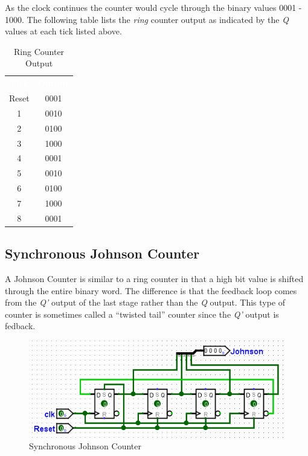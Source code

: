 As the clock continues the counter would cycle through the binary values 0001 - 1000. The following table lists the \textit{ring} counter output as indicated by the \textit{Q} values at each tick listed above.

\begin{table}[H]
	\sffamily
	\newcommand{\head}[1]{\textcolor{white}{\textbf{#1}}}		
	\begin{center}
		\begin{tabular}{cc} 
			\rowcolor{black!75}
			\head{Tick} & \head{Output} \\
			Reset & 0001 \\
			1 & 0010 \\
			2 & 0100 \\
			3 & 1000 \\
			4 & 0001 \\
			5 & 0010 \\
			6 & 0100 \\
			7 & 1000 \\
			8 & 0001 
		\end{tabular}
	\end{center}
	\caption{Ring Counter Output}
	\label{tab0604}
\end{table}

\subsection{Synchronous Johnson Counter}

A Johnson Counter is similar to a ring counter in that a high bit value is shifted through the entire binary word. The difference is that the feedback loop comes from the \textit{Q'} output of the last stage rather than the \textit{Q} output. This type of counter is sometimes called a ``twisted tail'' counter since the \textit{Q'} output is fedback.

\begin{figure}[H]
	\centering
	\includegraphics[width=\maxwidth{.95\linewidth}]{gfx/06-05}
	\caption{Synchronous Johnson Counter}
	\label{fig:06-05}
\end{figure}

